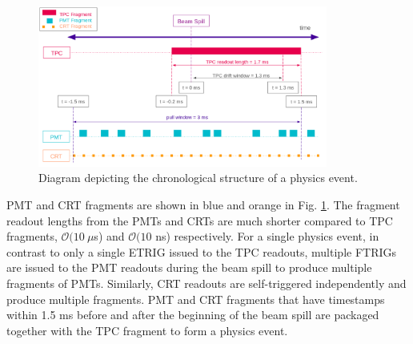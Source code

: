 \begin{figure}[b!] 
\centering    
\includegraphics[width=0.85\textwidth]{SBND_Event_Structure}
\caption[Chronological Structure of a Physics Event Diagram]{
Diagram depicting the chronological structure of a physics event. 
}
\label{fig:SBNDEventStructure}
\end{figure}



PMT and CRT fragments are shown in blue and orange in Fig. \ref{fig:SBNDEventStructure}.
The fragment readout lengths from the PMTs and CRTs are much shorter compared to TPC fragments, $\mathcal{O}(10\ \mu$s) and $\mathcal{O}(10$ ns) respectively.
For a single physics event, in contrast to only a single ETRIG issued to the TPC readouts, multiple FTRIGs are issued to the PMT readouts during the beam spill to produce multiple fragments of PMTs.
Similarly, CRT readouts are self-triggered independently and produce multiple fragments.
PMT and CRT fragments that have timestamps within 1.5 ms before and after the beginning of the beam spill are packaged together with the TPC fragment to form a physics event.

